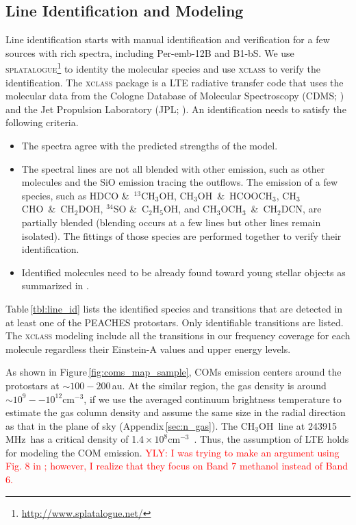 \documentclass[twocolumn]{aastex62}
\newcommand{\mhz}{\mbox{\,MHz}}
\newcommand{\ee}[1]{\mbox{${} \times 10^{#1}$}}%
\newcommand{\cc}{\mbox{cm$^{-3}$}}
\newcommand{\methylformate}{\mbox{HCOOCH$_{3}$}}
\newcommand{\methanol}{\mbox{CH$_{3}$OH}}
\newcommand{\tmethanol}{\mbox{$^{13}$CH$_{3}$OH}}
\newcommand{\dmethanol}{\mbox{CH$_{2}$DOH}}
\newcommand{\dimethylether}{\mbox{CH$_{3}$OCH$_{3}$}}
\newcommand{\ethanol}{\mbox{C$_{2}$H$_{5}$OH}}
\newcommand{\acetaldehyde}{\mbox{CH$_{3}$CHO}}
\newcommand{\dmethylcyanide}{\mbox{CH$_{2}$DCN}}
\begin{document}
\subsection{Line Identification and Modeling}
\label{sec:modeling}
Line identification starts with manual identification and verification for a few sources with rich spectra, including Per-emb-12B and B1-bS.  We use \textsc{splatalogue}\footnote{\href{http://www.splatalogue.net/}{http://www.splatalogue.net/}} to identity the molecular species and use \textsc{xclass} \citep{2017A&A...598A...7M} to verify the identification.  The \textsc{xclass} package is a LTE radiative transfer code that uses the molecular data from the Cologne Database of Molecular Spectroscopy (CDMS; \citealt{2001A&A...370L..49M,2005JMoSt.742..215M,2016JMoSp.327...95E}) and the Jet Propulsion Laboratory (JPL; \citealt{1998JQSRT..60..883P}).  An identification needs to satisfy the following criteria.
\begin{itemize}
  \item The spectra agree with the predicted strengths of the model.
  \item The spectral lines are not all blended with other emission, such as other molecules and the SiO emission tracing the outflows.  The emission of a few species, such as HDCO \&\ \tmethanol, \methanol\ \&\ \methylformate, \acetaldehyde\ \&\ \dmethanol, $^{34}$SO \&\ \ethanol, and \dimethylether\ \&\ \dmethylcyanide, are partially blended (blending occurs at a few lines but other lines remain isolated).  The fittings of those species are performed together to verify their identification.
  \item Identified molecules need to be already found toward young stellar objects as summarized in \citet{2018ApJS..239...17M}.
\end{itemize}
Table\,\ref{tbl:line_id} lists the identified species and transitions that are detected in at least one of the PEACHES protostars.  Only identifiable transitions are listed.  The \textsc{xclass} modeling include all the transitions in our frequency coverage for each molecule regardless their Einstein-A values and upper energy levels.  

As shown in Figure\,\ref{fig:coms_map_sample}, COMs emission centers around the protostars at $\sim 100-200$\,au.  At the similar region, the gas density is around $\sim 10^{9}--10^{12}$\cc, if we use the averaged continuum brightness temperature to estimate the gas column density and assume the same size in the radial direction as that in the plane of sky (Appendix\,\ref{sec:n_gas}).  The \methanol\ line at 243915\mhz\ has a critical density of 1.4\ee{8}\cc\ \citep{2005A&A...432..369S,2010MNRAS.406...95R}.  Thus, the assumption of LTE holds for modeling the COM emission.  \textcolor{red}{YLY: I was trying to make an argument using Fig. 8 in \citet{2016A&A...595A.117J}; however, I realize that they focus on Band 7 methanol instead of Band 6.}
\end{document}
